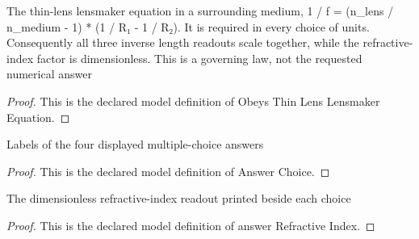 \begin{definition}
  \label{def:physics:phyx-mini-0035:phyxminiproblems-problemphyxmini0035-obeysthinlenslensmakerequation}
  The thin-lens lensmaker equation in a surrounding medium, 1 / f = (n\_lens / n\_medium - 1) * (1 / R₁ - 1 / R₂). It is required in every choice of units. Consequently all three inverse length readouts scale together, while the refractive-index factor is dimensionless. This is a governing law, not the requested numerical answer
\end{definition}
\begin{proof}
  This is the declared model definition of Obeys Thin Lens Lensmaker Equation.
\end{proof}
\begin{definition}
  \label{def:physics:phyx-mini-0035:phyxminiproblems-problemphyxmini0035-answerchoice}
  Labels of the four displayed multiple-choice answers
\end{definition}
\begin{proof}
  This is the declared model definition of Answer Choice.
\end{proof}
\begin{definition}
  \label{def:physics:phyx-mini-0035:phyxminiproblems-problemphyxmini0035-answerrefractiveindex}
  The dimensionless refractive-index readout printed beside each choice
\end{definition}
\begin{proof}
  This is the declared model definition of answer Refractive Index.
\end{proof}
